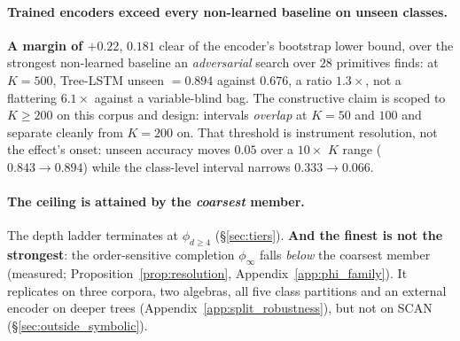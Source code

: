 \paragraph{Trained encoders exceed every non-learned baseline on unseen classes.} \textbf{A margin of $+0.22$}, $0.181$ clear of the encoder's bootstrap lower bound, over the strongest non-learned baseline an \emph{adversarial} search over $28$ primitives finds: at $K{=}500$, Tree-LSTM unseen $=0.894$ against $\mathbf{0.676}$, a ratio $1.3\times$, not a flattering $6.1\times$ against a variable-blind bag. The constructive claim is scoped to $K{\geq}200$ on this corpus and design: intervals \emph{overlap} at $K{=}50$ and $100$ and separate cleanly from $K{=}200$ on. That threshold is instrument resolution, not the effect's onset: unseen accuracy moves $0.05$ over a $10\times$ $K$ range ($0.843\to0.894$) while the class-level interval narrows $0.333\to0.066$.

\paragraph{The ceiling is attained by the \emph{coarsest} member.} The depth ladder terminates at $\phi_{d\geq4}$ (\S\ref{sec:tiers}). \textbf{And the finest is not the strongest}: the order-sensitive completion $\phi_\infty$ falls \emph{below} the coarsest member (measured; Proposition~\ref{prop:resolution}, Appendix~\ref{app:phi_family}). It replicates on three corpora, two algebras, all five class partitions and an external encoder on deeper trees (Appendix~\ref{app:split_robustness}), but not on SCAN (\S\ref{sec:outside_symbolic}).

